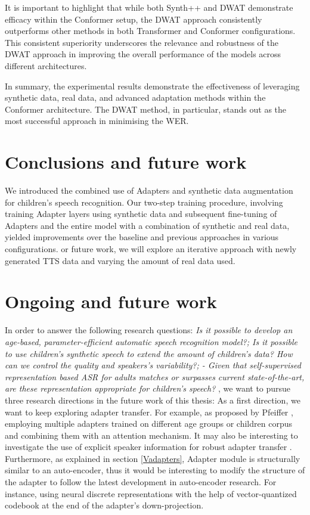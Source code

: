 It is important to highlight that while both Synth++ and DWAT demonstrate efficacy within the Conformer setup, the DWAT approach consistently outperforms other methods in both Transformer and Conformer configurations. This consistent superiority underscores the relevance and robustness of the DWAT approach in improving the overall performance of the models across different architectures.

In summary, the experimental results demonstrate the effectiveness of leveraging synthetic data, real data, and advanced adaptation methods within the Conformer architecture. The DWAT method, in particular, stands out as the most successful approach in minimising the WER.

\section{Conclusions and future work}
\label{section:conclusions_tts}
We introduced the combined use of Adapters and synthetic data augmentation for children's speech recognition. Our two-step training procedure, involving training Adapter layers %
using synthetic data and subsequent fine-tuning of Adapters and the entire model with a combination of synthetic and real data, yielded improvements over the baseline and previous approaches in various configurations.
or future work, we will explore an iterative approach with newly generated TTS data and varying the amount of real data used.%

\section{Ongoing and future work} %
\label{section:ongoing}
In order to answer the following research questions: \textit{Is it possible to develop an age-based, parameter-efficient automatic speech recognition model?; Is it possible to use children's synthetic speech to extend the amount of children's data? How can we control the quality and speakers’s variability?; - Given that self-supervised representation based ASR for adults matches or surpasses current state-of-the-art, are these representation appropriate for children’s speech? },
we want to pursue three research directions in the future work of this thesis: As a first direction, we want to keep exploring adapter transfer. For example, as proposed by Pfeiffer \cite{pfeiffer2020adapterfusion}, employing multiple adapters trained on different age groups or children corpus and combining them with an attention mechanism. It may also be interesting to investigate the use of explicit speaker information for robust adapter transfer \cite{gong2022layer}. Furthermore, as explained in section \ref{Vadapters}, Adapter module is structurally similar to an auto-encoder, thus it would be interesting to modify the structure of the adapter to follow the latest development in auto-encoder research. For instance, using neural discrete representations with the help of vector-quantized codebook\cite{van2017neural} at the end of the adapter's down-projection.

